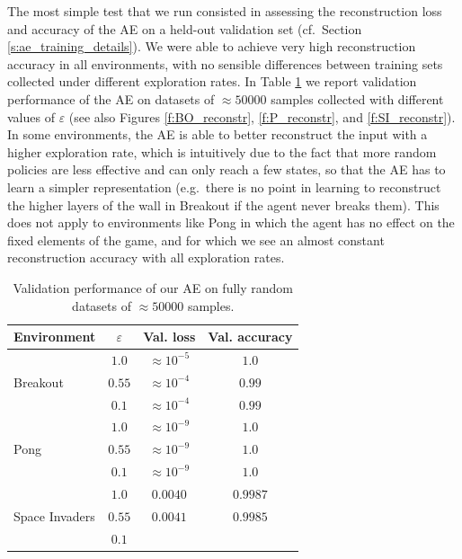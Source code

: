 The most simple test that we run consisted in assessing the reconstruction loss
and accuracy of the AE on a held-out validation set (cf.\ Section \ref{s:ae_training_details}). 
We were able to achieve very high reconstruction accuracy in all environments, 
with no sensible differences between training sets collected under different 
exploration rates. In Table \ref{t:ae_training_precision} we report validation 
performance of the AE on datasets of $\approx50000$ samples collected with 
different values of $\varepsilon$ (see also Figures \ref{f:BO_reconstr}, 
\ref{f:P_reconstr}, and \ref{f:SI_reconstr}). 
In some environments, the AE is able to better reconstruct the input with a 
higher exploration rate, which is intuitively due to the fact that more random 
policies are less effective and can only reach a few states, so that the AE has
to learn a simpler representation (e.g.\ there is no point in learning to 
reconstruct the higher layers of the wall in Breakout if the agent never breaks 
them).
This does not apply to environments like Pong in which the agent has no effect 
on the fixed elements of the game, and for which we see an almost constant
reconstruction accuracy with all exploration rates. 
%
\begin{table}
    \centering
    \begin{tabular}{l c c c} 
	\hline
	Environment                     & $\varepsilon$ & Val. loss        & Val. accuracy \\ 
	\hline 
	\multirow{3}{*}{Breakout}       & $1.0$         & $\approx10^{-5}$ & $1.0$  \\
	                                & $0.55$        & $\approx10^{-4}$ & $0.99$ \\
	                                & $0.1$         & $\approx10^{-4}$ & $0.99$ \\
	\hline
	\multirow{3}{*}{Pong}           & $1.0$         & $\approx10^{-9}$ & $1.0$  \\ 
	                                & $0.55$        & $\approx10^{-9}$ & $1.0$  \\
	                                & $0.1$         & $\approx10^{-9}$ & $1.0$ \\
	\hline
	\multirow{3}{*}{Space Invaders} & $1.0$         & $0.0040$         & $0.9987$ \\
	                                & $0.55$        & $0.0041$         & $0.9985$ \\
	                                & $0.1$         & $ $              & $ $ \\
	\hline
    \end{tabular}
    \caption[AE validation performance]{Validation performance of our AE on
	     fully random datasets of $\approx50000$ samples.}
    \label{t:ae_training_precision}
\end{table}

